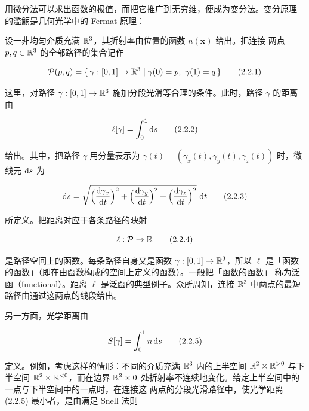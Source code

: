 用微分法可以求出函数的极值，而把它推广到无穷维，便成为变分法。变分原理
的滥觞是几何光学中的 Fermat 原理：


设一非均匀介质充满 $\mathbb{R}^3$，其折射率由位置的函数 $n(\bm{x})$ 给出。把连接
两点 $p,q\in\mathbb{R}^3$ 的全部路径的集合记作

\begin{equation}
  \mathcal{P}(p,q) = \{\,\gamma:[0,1]\to\mathbb{R}^3 \mid \gamma(0)=p,\ \gamma(1)=q\,\}
  \tag{2.2.1}
\end{equation}

这里，对路径 $\gamma:[0,1]\to\mathbb{R}^3$ 施加分段光滑等合理的条件。此时，路径
$\gamma$ 的距离由

\begin{equation}
  \ell[\gamma] = \int_0^1 \mathrm{d} s
  \tag{2.2.2}
\end{equation}

给出。其中，把路径 $\gamma$ 用分量表示为
$\gamma(t) = (\gamma_x(t),\gamma_y(t),\gamma_z(t))$ 时，微线元 $\mathrm{d} s$ 为

\begin{equation}
  \mathrm{d} s = \sqrt{\Bigl(\frac{\mathrm{d}\gamma_x}{\mathrm{d} t}\Bigr)^2
    + \Bigl(\frac{\mathrm{d}\gamma_y}{\mathrm{d} t}\Bigr)^2
    + \Bigl(\frac{\mathrm{d}\gamma_z}{\mathrm{d} t}\Bigr)^2}\ \mathrm{d} t
  \tag{2.2.3}
\end{equation}

所定义。把距离对应于各条路径的映射

\begin{equation}
  \ell : \mathcal{P} \to \mathbb{R}
  \tag{2.2.4}
\end{equation}

是路径空间上的函数。每条路径自身又是函数 $\gamma:[0,1]\to\mathbb{R}^3$，所以 $\ell$
是「函数的函数」（即在由函数构成的空间上定义的函数）。一般把「函数的函数」
称为泛函（functional）。距离 $\ell$ 是泛函的典型例子。众所周知，连接 $\mathbb{R}^3$
中两点的最短路径由通过这两点的线段给出。

另一方面，光学距离由

\begin{equation}
  S[\gamma] = \int_0^1 n\,\mathrm{d} s
  \tag{2.2.5}
\end{equation}

定义。例如，考虑这样的情形：不同的介质充满 $\mathbb{R}^3$ 内的上半空间
$\mathbb{R}^2\times\mathbb{R}^{>0}$ 与下半空间 $\mathbb{R}^2\times\mathbb{R}^{<0}$，而在边界 $\mathbb{R}^2\times 0$
处折射率不连续地变化。给定上半空间中的一点与下半空间中的一点时，在连接这
两点的分段光滑路径中，使光学距离 (2.2.5) 最小者，是由满足 Snell 法则


